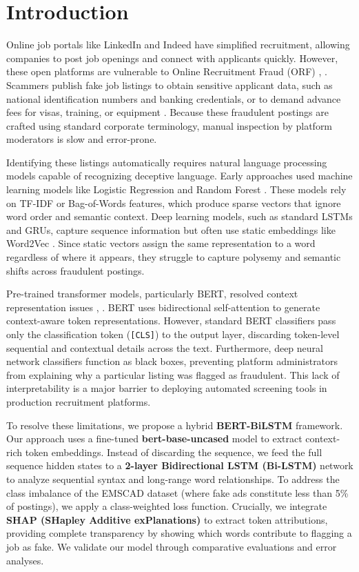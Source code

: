 \documentclass[conference]{IEEEtran}
\begin{document}
\section{Introduction}
Online job portals like LinkedIn and Indeed have simplified recruitment, allowing companies to post job openings and connect with applicants quickly. However, these open platforms are vulnerable to Online Recruitment Fraud (ORF) \cite{taneja2025fraud}, \cite{pillai2023detecting}. Scammers publish fake job listings to obtain sensitive applicant data, such as national identification numbers and banking credentials, or to demand advance fees for visas, training, or equipment \cite{naude2023machine}. Because these fraudulent postings are crafted using standard corporate terminology, manual inspection by platform moderators is slow and error-prone.

Identifying these listings automatically requires natural language processing models capable of recognizing deceptive language. Early approaches used machine learning models like Logistic Regression and Random Forest \cite{chiraratanasopha2022detecting}. These models rely on TF-IDF or Bag-of-Words features, which produce sparse vectors that ignore word order and semantic context. Deep learning models, such as standard LSTMs and GRUs, capture sequence information but often use static embeddings like Word2Vec \cite{pillai2023detecting}. Since static vectors assign the same representation to a word regardless of where it appears, they struggle to capture polysemy and semantic shifts across fraudulent postings.

Pre-trained transformer models, particularly BERT, resolved context representation issues \cite{sanisetty2025comprehensive}, \cite{srilakshmi2026transformer}. BERT uses bidirectional self-attention to generate context-aware token representations. However, standard BERT classifiers pass only the classification token (\texttt{[CLS]}) to the output layer, discarding token-level sequential and contextual details across the text. Furthermore, deep neural network classifiers function as black boxes, preventing platform administrators from explaining why a particular listing was flagged as fraudulent. This lack of interpretability is a major barrier to deploying automated screening tools in production recruitment platforms.

To resolve these limitations, we propose a hybrid \textbf{BERT-BiLSTM} framework. Our approach uses a fine-tuned \textbf{bert-base-uncased} model to extract context-rich token embeddings. Instead of discarding the sequence, we feed the full sequence hidden states to a \textbf{2-layer Bidirectional LSTM (Bi-LSTM)} network to analyze sequential syntax and long-range word relationships. To address the class imbalance of the EMSCAD dataset (where fake ads constitute less than 5\% of postings), we apply a class-weighted loss function. Crucially, we integrate \textbf{SHAP (SHapley Additive exPlanations)} to extract token attributions, providing complete transparency by showing which words contribute to flagging a job as fake. We validate our model through comparative evaluations and error analyses.
\end{document}
